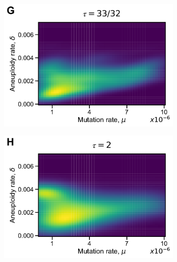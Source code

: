 \documentclass[12pt]{extarticle}
\begin{document}
\begin{figure}[h!]
\begin{subfigure}{0.325\textwidth}
  \end{subfigure}
\begin{subfigure}{0.325\textwidth}
      \includegraphics[width=\textwidth]{../figures/tau-joint-G.pdf}      
  \end{subfigure}
\begin{subfigure}{0.325\textwidth}
      \includegraphics[width=\textwidth]{../figures/tau-joint-H.pdf}      
  \end{subfigure}
\begin{subfigure}{0.325\textwidth}

\end{subfigure}
\end{figure}
\end{document}
